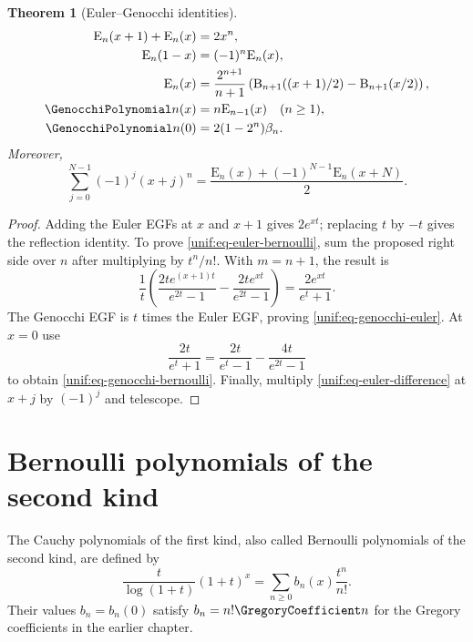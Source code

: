 \documentclass[11pt,a4paper,oneside,openany]{book}
\newtheorem{theorem}{Theorem}[chapter]
\theoremstyle{definition}
\theoremstyle{remark}
\newcommand{\BerP}[2]{\mathrm B_{#1}(#2)}
\newcommand{\EulP}[2]{\mathrm E_{#1}(#2)}
\begin{document}
\begin{theorem}[Euler--Genocchi identities]
\label{unif:thm-euler-genocchi}
\begin{align}
 \EulP n{x+1}+\EulP n x&=2x^n,
 \label{unif:eq-euler-difference}\\
 \EulP n{1-x}&=(-1)^n\EulP n x,
 \label{unif:eq-euler-reflection}\\
 \EulP n x&=\frac{2^{n+1}}{n+1}
 \left(\BerP{n+1}{(x+1)/2}-\BerP{n+1}{x/2}\right),
 \label{unif:eq-euler-bernoulli}\\
 \GenocchiPolynomial n(x)&=n\EulP{n-1}x\quad(n\ge1),
 \label{unif:eq-genocchi-euler}\\
 \GenocchiPolynomial n(0)&=2(1-2^n)\beta_n.
 \label{unif:eq-genocchi-bernoulli}
\end{align}
Moreover,
\begin{equation}\label{unif:eq-alternating-power-sum}
 \sum_{j=0}^{N-1}(-1)^j(x+j)^n
 =\frac{\EulP n x+(-1)^{N-1}\EulP n{x+N}}2.
\end{equation}
\end{theorem}
\begin{proof}
Adding the Euler EGFs at $x$ and $x+1$ gives $2e^{xt}$; replacing $t$ by
$-t$ gives the reflection identity. To prove
\eqref{unif:eq-euler-bernoulli}, sum the proposed right side over $n$ after
multiplying by $t^n/n!$. With $m=n+1$, the result is
\[
 \frac1t\left(
 \frac{2te^{(x+1)t}}{e^{2t}-1}-
 \frac{2te^{xt}}{e^{2t}-1}\right)
 =\frac{2e^{xt}}{e^t+1}.
\]
The Genocchi EGF is $t$ times the Euler EGF, proving
\eqref{unif:eq-genocchi-euler}. At $x=0$ use
\[
 \frac{2t}{e^t+1}=\frac{2t}{e^t-1}-\frac{4t}{e^{2t}-1}
\]
to obtain \eqref{unif:eq-genocchi-bernoulli}. Finally, multiply
\eqref{unif:eq-euler-difference} at $x+j$ by $(-1)^j$ and telescope.
\end{proof}

\section{Bernoulli polynomials of the second kind}

The Cauchy polynomials of the first kind, also called Bernoulli polynomials of
the second kind, are defined by
\begin{equation}\label{unif:eq-cauchy-polynomial-egf}
 \frac{t}{\log(1+t)}(1+t)^x
 =\sum_{n\ge0}b_n(x)\frac{t^n}{n!}.
\end{equation}
Their values $b_n=b_n(0)$ satisfy $b_n=n!\GregoryCoefficient n$ for the Gregory coefficients in
the earlier chapter.
\end{document}
